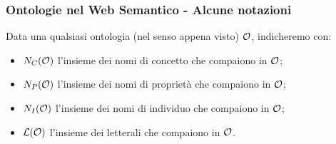 \documentclass[8pt]{beamer}
\begin{document}
\begin{frame}
\frametitle{Ontologie nel Web Semantico - Alcune notazioni}
Data una qualsiasi ontologia (nel senso appena visto) $\mathcal{O}$, indicheremo con:
\begin{itemize}
 \item $N_C(\mathcal{O})$ l'insieme dei nomi di concetto che compaiono in $\mathcal{O}$;
 \item $N_P(\mathcal{O})$ l'insieme dei nomi di propriet\`a che compaiono in $\mathcal{O}$;
 \item $N_I(\mathcal{O})$ l'insieme dei nomi di individuo che compaiono in $\mathcal{O}$;
 \item $\mathcal{L}(\mathcal{O})$ l'insieme dei letterali che compaiono in $\mathcal{O}$.
\end{itemize}

\end{frame}

% 
% 
\end{document}
